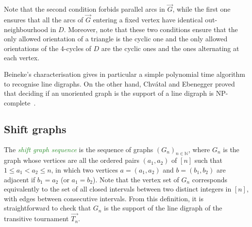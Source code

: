 \documentclass[11pt,a4aper]{article}
\renewcommand{\ge}{\geqslant}
\renewcommand{\le}{\leqslant}
\DeclareRobustCommand*{\ora}{\overrightarrow}
\newcommand*{\orG}{\ora{G}}
\newcommand*{\orTn}{\ora{T_n}}
\newcommand{\defin}[1]{\emph{\textcolor{ForestGreen}{#1}}}
\begin{document}
  

Note that the second condition forbids parallel arcs in $\orG$, while the first
one ensures that all the arcs of $\orG$ entering a fixed vertex have identical
out-neighbourhood in $D$. Moreover, note that these two conditions ensure that
the only allowed orientation of a triangle is the cyclic one and the only
allowed orientations of the 4-cycles of $D$ are the cyclic ones and the ones
alternating at each vertex. 

Beineke's characterisation gives in particular a simple polynomial time
algorithm to recognise line digraphs. On the other hand, Chv\'atal and Ebenegger
proved that deciding if an unoriented graph is the support of a line digraph is
NP-complete~\cite{chvatal1990Note}.

\subsection{Shift graphs}

The \defin{shift graph sequence} is the sequence of graphs
$(G_n)_{n \in \mathbb{N}}$, where $G_n$ is the graph whose vertices are all the
ordered pairs $(a_1,a_2)$ of $[n]$ such that $1 \le a_1 < a_2 \le n$, in which
two vertices $a = (a_1, a_2)$ and $b = (b_1, b_2)$ are adjacent if $b_1 = a_2$
(or $a_1 = b_2$). Note that the vertex set of $G_n$ corresponds equivalently to
the set of all closed intervals between two distinct integers in $[n]$, with
edges between consecutive intervals. From
this definition, it is straightforward to check that $G_n$ is the support of the
line digraph of the transitive tournament $\orTn$.
\end{document}
